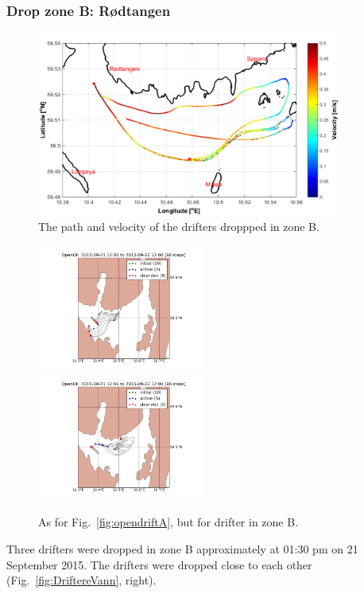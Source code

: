 \documentclass[12pt,a4paper,english]{article}
\begin{document}
\subsubsection{Drop zone B: R\o dtangen}
%
\begin{figure}[ht]
\centerline{
\includegraphics*[width=0.9\textwidth]{Figurer/zoneB}}
\caption{\small
The path and velocity of the drifters droppped in zone B.}
\label{fig:ZoneB}
\end{figure}
%
\begin{figure}[ht]
\centerline{
\includegraphics*[width=0.495\textwidth]{Opendrift_simulations/dropzone_B_no7_fjordos_arome}
\includegraphics*[width=0.495\textwidth]{Opendrift_simulations/dropzone_B_no7_norkyst_arome}
}
\caption{\small
As for Fig.~\ref{fig:opendriftA}, but for drifter in zone B.
}
\label{fig:opendriftB}
\end{figure}
%
Three drifters were dropped in zone B approximately at 01:30 pm on 21 September 2015. The drifters were dropped close to each other (Fig.~\ref{fig:DriftereVann}, right).
\end{document}
